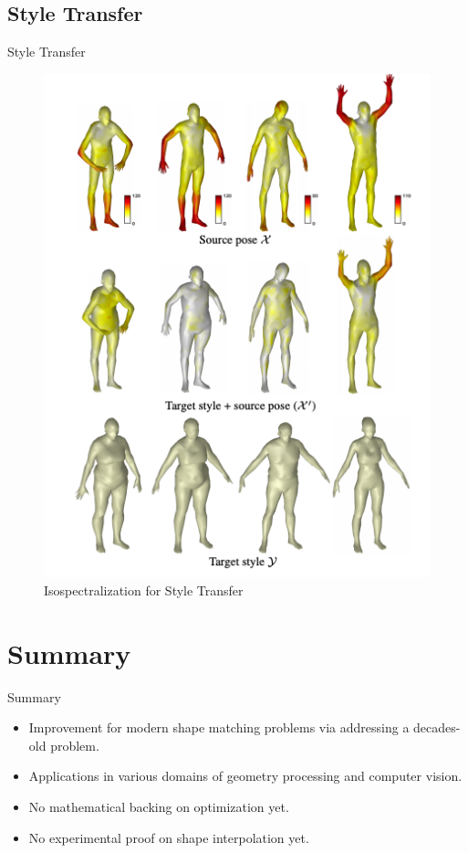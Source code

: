 \documentclass{beamer}
\begin{document}
    
    
    




\subsection{Style Transfer}

\begin{frame}{Style Transfer}
\begin{figure}
    \centering
    \includegraphics[height=0.5\textwidth]{Styletransfer.png}
    \caption{Isospectralization for Style Transfer}
    \label{fig:styletransfer}
\end{figure}
    
\end{frame}


\section{Summary}

\begin{frame}{Summary}
    \begin{itemize}
        \item Improvement for modern shape matching problems via addressing a decades-old problem. 
        \item Applications in various domains of geometry processing and computer vision.
        \item No mathematical backing on optimization yet.
        \item No experimental proof on shape interpolation yet.
    \end{itemize}
\end{frame}
\end{document}
